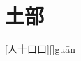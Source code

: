 \chapter{土部}

\begin{Lemma} %
	[人十口口][]{gu\=an}{}
	\pro{}\lipsum
	\begin{mainenum}
		\mitem  \en{}
		\E{\e \e \e }
		\mitem  \en{}
		\E{\e \e \e }
		\mitem  \en{}
		\E{\e \e \e }
	\end{mainenum}
\end{Lemma}








